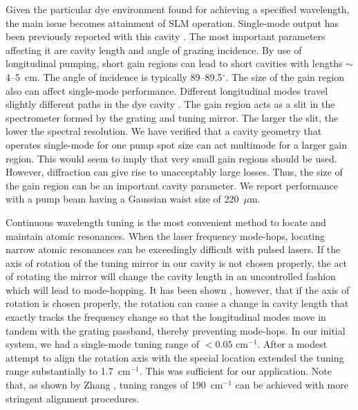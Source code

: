 Given the particular dye environment found for achieving a specified 
wavelength, the main issue becomes attainment of SLM operation.
Single-mode output has been previously reported with this cavity 
\cite{Littman:84,Littman:78b}.  The most important parameters affecting it are
cavity length and angle of grazing incidence.  By use of longitudinal pumping,
short gain regions can lead to short cavities with lengths $\sim$ 4--5~cm.
The angle of incidence is typically 89--89.5$^{\circ}$.  The size of the
gain region also can affect single-mode performance.  Different
longitudinal modes travel slightly different paths in the dye cavity
\cite{Kangas:89}.  The gain region acts as a slit in the spectrometer
formed by the grating and tuning mirror. The larger the slit, the lower the
spectral resolution. We have verified that a cavity geometry that operates
single-mode for one pump spot size can act multimode for a larger gain
region.  This would seem to imply that very small gain regions should be
used.  However, diffraction can give rise to unacceptably large losses. 
Thus, the size of the gain region can be an important cavity parameter.  We
report performance with a pump beam having a Gaussian waist size of 220~$\mu$m.

Continuous wavelength tuning is the most convenient method to locate and
maintain atomic resonances.  When the laser frequency mode-hops, locating
narrow atomic resonances can be exceedingly difficult with pulsed lasers.
If the axis of rotation of the tuning mirror in our cavity is not chosen 
properly, the act of rotating the mirror will change the cavity length in an
uncontrolled fashion which will lead to mode-hopping.  It has been shown
\cite{Liu:81,Zhang:92}, however, that if the axis of rotation is  chosen
properly, the rotation can cause a change in cavity length that exactly tracks
the frequency change so that the longitudinal modes move in tandem with the
grating passband, thereby preventing mode-hops.  In our initial system, we had a
single-mode tuning range of $< 0.05$ cm$^{-1}$.  After a modest attempt
to align the rotation axis with the special location extended the tuning range
substantially to 1.7~cm$^{-1}$.  This was sufficient for our application. 
Note that, as shown by Zhang \etal \cite{Zhang:92}, tuning ranges of
190~cm$^{-1}$ can be achieved with more stringent alignment procedures.

